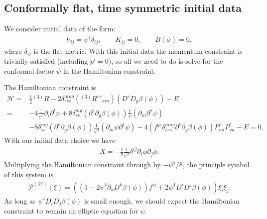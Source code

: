 \documentclass[%
notitlepage,
report,
nofootinbib,
 amsmath,amssymb,
 aps,
]{revtex4-1}
\begin{document}
\subsection{Conformally flat, time symmetric initial data}
\label{eq:cfts_id}
We consider initial data of the form:
\begin{align}
   h_{ij}
   =
   \psi^4\delta_{ij}
   ,\qquad
   K_{ij}
   =
   0
   ,\qquad
   B\left(\phi\right)
   =
   0
   ,
\end{align}
where $\delta_{ij}$ is the flat metric.
With this initial data the momentum constraint is
trivially satisfied (including $p^i=0$),
so all we need to do is solve
for the conformal factor $\psi$ in the Hamiltonian constraint.

The Hamiltonian constraint is
\begin{align}
   \mathcal{H}
   =&
   \frac{1}{2}{}^{(3)}R
   -
   2\delta^{mng}_{rse}
   \left({}^{(3)}R^{rs}{}_{mn}\right)
   \left(D^{e}D_{g}\beta\left(\phi\right)\right)
   -
   E
   \nonumber\\
   =&
   -
   4\frac{1}{\psi^5}\partial_i\partial^i\psi
   +
   8\delta^{mg}_{se}
   \left(\partial^e\partial_g\beta\left(\phi\right)\right)
   \frac{1}{\psi}\left(\partial_m\partial^s\psi\right)
   \nonumber\\
   &
   -
   8\delta^{mg}_{se}
   \left(\partial^e\partial_g\beta\left(\phi\right)\right)
   \frac{1}{\psi^2}\left(\partial_m\psi \partial^s\psi\right)
   -
   4\left(
      f^{qs}\delta^{mng}_{rse}
      \partial^e\partial_g\beta\left(\phi\right)
   \right)
   P^r_{ml}P^l_{qn}
   -
   E
   =
   0
   ,
\end{align}
With our initial data choice we have
\begin{align}
   X
   =
   -
   \frac{1}{2}\frac{1}{\psi^4}\delta^{ij}\partial_i\phi \partial_j\phi
   .
\end{align}
Multiplying the Hamiltonian constraint through
by $-\psi^5/8$, the principle symbol of this system is
\begin{align}
   \mathcal{P}^{(\mathcal{H})}\left(\xi\right)
   =
   \left(
      \left(
         1
         -
         2\psi^4\partial_kD^k\beta\left(\phi\right)
      \right)
      f^{ij}
      +
      2\psi^4D^iD^j\beta\left(\phi\right)
   \right)
   \xi_i\xi_j 
   .
\end{align}
As long as $\psi^4D_iD_j\beta\left(\phi\right)$ is small enough,
we should expect the Hamiltonian constraint to remain an elliptic
equation for $\psi$.
\end{document}
